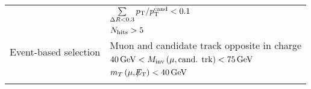 \begin{table}[!h]
{\begin{tabular}{l|l }
                                                               &  $\sum \limits_{\Delta R < 0.3} p_{\text{T}}/p_{\text{T}}^{\text{cand}} < 0.1$\\  
                                                               &  $N_{\text{hits}}>5$             \\  
\midrule
\multirow{2}{*}{Event-based selection}                         &  Muon and candidate track opposite in charge                                     \\
                                                               &  $40\,\text{Ge}\kern-0.06667em\text{V}<M_{\text{inv}}\left( \mu, \text{cand. trk}  \right)<75\,\text{Ge}\kern-0.06667em\text{V}$        \\
                                                               & $m_T\left(\mu,\slash\mkern-12mu{E}_{\text{T}}\right)<40\,\text{Ge}\kern-0.06667em\text{V}$ \\

\bottomrule
\multicolumn{2}{c}{} \\
\end{tabular}}
\end{table}


